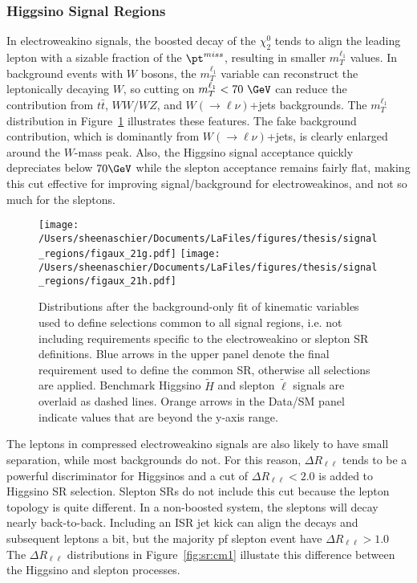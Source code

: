  \subsubsection{Higgsino Signal Regions}
\label{sec:sr:mll}
In electroweakino signals, the boosted decay of the $\chi_2^0$ tends to align the leading lepton with a sizable fraction of the $\pt^{miss}$, resulting in smaller $m_T^{\ell_1}$ values.  In background events with $W$ bosons, the $m_T^{\ell_1}$ variable can reconstruct the leptonically decaying $W$, so cutting on $m_T^{\ell_1} < 70~\GeV$ can reduce the contribution from $t\bar{t}$, $WW/WZ$, and $W(\rightarrow\ell\nu)$+jets backgrounds.  The $m_T^{\ell_1}$ distribution in Figure~\ref{fig:sr:cm4} illustrates these features.  The fake background contribution, which is dominantly from $W(\rightarrow\ell\nu)$+jets, is clearly enlarged around the $W$-mass peak.  Also, the Higgsino signal acceptance quickly depreciates below $70\GeV$ while the slepton acceptance remains fairly flat, making this cut effective for improving signal/background for electroweakinos, and not so much for the sleptons.
   \begin{figure}%
  \begin{center}
      \texttt{[image: /Users/sheenaschier/Documents/LaFiles/figures/thesis/signal\_regions/figaux\_21g.pdf]}
         \texttt{[image: /Users/sheenaschier/Documents/LaFiles/figures/thesis/signal\_regions/figaux\_21h.pdf]}
   \end{center}
 \caption{Distributions after the background-only fit of kinematic variables used to define selections common to all signal regions, i.e. not including requirements specific to the electroweakino or slepton SR definitions. Blue arrows in the upper panel denote the final requirement used to define the common SR, otherwise all selections are applied. %
Benchmark Higgsino $\tilde H$ and slepton $\tilde\ell$ signals are overlaid as dashed lines. Orange arrows in the Data/SM panel indicate values that are beyond the y-axis range.}
 \label{fig:sr:cm4}
 \end{figure}

The leptons in compressed electroweakino signals are also likely to have small separation, while most backgrounds do not.  For this reason, $\Delta R_{\ell\ell}$ tends to be a powerful discriminator for Higgsinos and a cut of $\Delta R_{\ell\ell} < 2.0$ is added to Higgsino SR selection.  Slepton SRs do not include this cut because the lepton topology is quite different.  In a non-boosted system, the sleptons will decay nearly back-to-back.  Including an ISR jet kick can align the decays and subsequent leptons a bit, but the majority pf slepton event have $\Delta R_{\ell\ell} >1.0$   The $\Delta R_{\ell\ell}$ distributions in Figure~\ref{fig:sr:cm1} illustate this difference between the Higgsino and slepton processes. 

